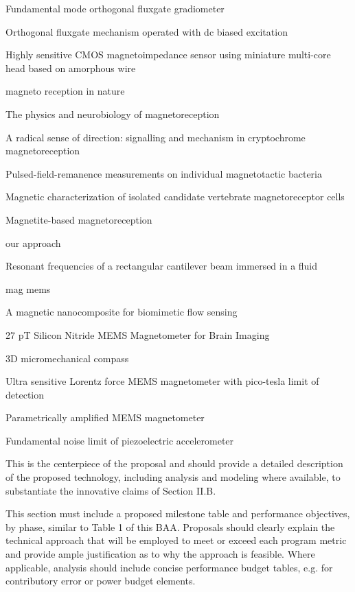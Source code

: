 \cite{sasada2014fundamental} Fundamental mode orthogonal fluxgate gradiometer

\cite{sasada2002orthogonal} Orthogonal fluxgate mechanism operated with dc biased excitation

\cite{uchiyama2014highly} Highly sensitive CMOS magnetoimpedance sensor using miniature multi-core head based on amorphous wire

magneto reception in nature

\cite{johnsen2005physics} The physics and neurobiology of magnetoreception

\cite{dodson2013radical} A radical sense of direction: signalling and mechanism in cryptochrome magnetoreception

\cite{hanzlik2002pulsed} Pulsed-field-remanence measurements on individual magnetotactic bacteria

\cite{eder2012magnetic} Magnetic characterization of isolated candidate vertebrate magnetoreceptor cells

\cite{kirschvink2001magnetite} Magnetite-based magnetoreception


our approach

\cite{van2006resonant} Resonant frequencies of a rectangular cantilever beam immersed in a fluid

\cite{arnold2009permanent} mag mems

\cite{alfadhel2014magnetic} A magnetic nanocomposite for biomimetic flow sensing

\cite{sinha201627} 27 pT Silicon Nitride MEMS Magnetometer for Brain Imaging

\cite{kyynarainen20083d} 3D micromechanical compass

\cite{kumar2015ultra} Ultra sensitive Lorentz force MEMS magnetometer with pico-tesla limit of detection

\cite{thompson2009parametrically} Parametrically amplified MEMS magnetometer

\cite{levinzon2004fundamental} Fundamental noise limit of piezoelectric accelerometer




This is the centerpiece of the proposal and should provide a detailed description of the
proposed technology, including analysis and modeling where available, to substantiate the
innovative claims of Section II.B.

This section must include a proposed milestone table and
performance objectives, by phase, similar to Table 1 of this BAA. Proposals should clearly
explain the technical approach that will be employed to meet or exceed each program metric
and provide ample justification as to why the approach is feasible. Where applicable, analysis
should include concise performance budget tables, e.g. for contributory error or power
budget elements.

